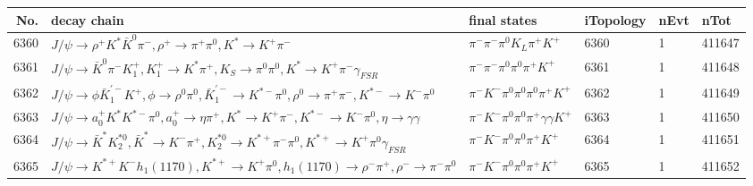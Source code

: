 \begin{table}[htbp] 
\begin{center}
\begin{small}
\begin{tabular}{rlllll}\hline\hline
 No. & decay chain & final states &  iTopology & nEvt & nTot \\\hline
6360&$J/\psi       \rightarrow \rho^{+}      K^{*}          \bar{K}^{0}   \pi^{-}        , \rho^{+}       \rightarrow \pi^{+}        \pi^{0}        , K^{*}           \rightarrow K^{+}          \pi^{-}        $&$\pi^{-}        \pi^{-}        \pi^{0}        K_{L}          \pi^{+}        K^{+}          $& 6360&    1&411647\\
6361&$J/\psi       \rightarrow \bar{K}^{0}   \pi^{-}        K_1^{+}        , K_1^{+}         \rightarrow K^{*}          \pi^{+}        , K_{S}           \rightarrow \pi^{0}        \pi^{0}        , K^{*}           \rightarrow K^{+}          \pi^{-}        \gamma_{FSR} $&$\pi^{-}        \pi^{-}        \pi^{0}        \pi^{0}        \pi^{+}        K^{+}          $& 6361&    1&411648\\
6362&$J/\psi       \rightarrow \phi           \bar{K}_1^{'-}K^{+}          , \phi            \rightarrow \rho^{0}      \pi^{0}        , \bar{K}_1^{'-} \rightarrow K^{*-}         \pi^{0}        , \rho^{0}       \rightarrow \pi^{+}        \pi^{-}        , K^{*-}          \rightarrow K^{-}          \pi^{0}        $&$\pi^{-}        K^{-}          \pi^{0}        \pi^{0}        \pi^{0}        \pi^{+}        K^{+}          $& 6362&    1&411649\\
6363&$J/\psi       \rightarrow a_{0}^{+}      K^{*}          K^{*-}         \pi^{0}        , a_{0}^{+}       \rightarrow \eta          \pi^{+}        , K^{*}           \rightarrow K^{+}          \pi^{-}        , K^{*-}          \rightarrow K^{-}          \pi^{0}        , \eta           \rightarrow \gamma       \gamma       $&$\pi^{-}        K^{-}          \pi^{0}        \pi^{0}        \pi^{+}        \gamma       \gamma       K^{+}          $& 6363&    1&411650\\
6364&$J/\psi       \rightarrow \bar{K}^{*}   K_2^{*0}       , \bar{K}^{*}    \rightarrow K^{-}          \pi^{+}        , K_2^{*0}        \rightarrow K^{*+}         \pi^{-}        \pi^{0}        , K^{*+}          \rightarrow K^{+}          \pi^{0}        \gamma_{FSR} $&$\pi^{-}        K^{-}          \pi^{0}        \pi^{0}        \pi^{+}        K^{+}          $& 6364&    1&411651\\
6365&$J/\psi       \rightarrow K^{*+}         K^{-}          h_{1}(1170)    , K^{*+}          \rightarrow K^{+}          \pi^{0}        , h_{1}(1170)     \rightarrow \rho^{-}      \pi^{+}        , \rho^{-}       \rightarrow \pi^{-}        \pi^{0}        $&$\pi^{-}        K^{-}          \pi^{0}        \pi^{0}        \pi^{+}        K^{+}          $& 6365&    1&411652\\

\end{tabular}
\end{small}
\end{center}
\end{table}
